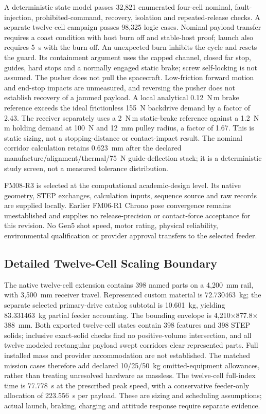 \documentclass[conference]{IEEEtran}
\begin{document}
A deterministic state model passes 32,821 enumerated four-cell nominal, fault-injection, prohibited-command, recovery, isolation and repeated-release checks. A separate twelve-cell campaign passes 98,325 logic cases. Nominal payload transfer requires a coast condition with host burn off and stable-host proof; launch also requires 5~s with the burn off. An unexpected burn inhibits the cycle and resets the guard. Its containment argument uses the capped channel, closed far stop, guides, hard stops and a normally engaged static brake; screw self-locking is not assumed. The pusher does not pull the spacecraft. Low-friction forward motion and end-stop impacts are unmeasured, and reversing the pusher does not establish recovery of a jammed payload. A local analytical 0.12~N\,m brake reference exceeds the ideal frictionless 155~N backdrive demand by a factor of 2.43. The receiver separately uses a 2~N\,m static-brake reference against a 1.2~N\,m holding demand at 100~N and 12~mm pulley radius, a factor of 1.67. This is static sizing, not a stopping-distance or contact-impact result. The nominal corridor calculation retains 0.623~mm after the declared manufacture/alignment/thermal/75~N guide-deflection stack; it is a deterministic study screen, not a measured tolerance distribution.

FM08-R3 is selected at the computational academic-design level. Its native geometry, STEP exchanges, calculation inputs, sequence source and raw records are supplied locally. Earlier FM06-R1 Chrono pose convergence remains unestablished and supplies no release-precision or contact-force acceptance for this revision. No Gen5 shot speed, motor rating, physical reliability, environmental qualification or provider approval transfers to the selected feeder.

\subsection{Detailed Twelve-Cell Scaling Boundary}
The native twelve-cell extension contains 398 named parts on a 4,200~mm rail, with 3,500~mm receiver travel. Represented custom material is 72.730463~kg; the separate selected primary-drive catalog subtotal is 10.601~kg, yielding 83.331463~kg partial feeder accounting. The bounding envelope is 4,210$\times$877.8$\times$388~mm. Both exported twelve-cell states contain 398 features and 398 STEP solids; inclusive exact-solid checks find no positive-volume intersection, and all twelve modeled rectangular payload swept corridors clear represented parts. Full installed mass and provider accommodation are not established. The matched mission cases therefore add declared 10/25/50~kg omitted-equipment allowances, rather than treating unresolved hardware as massless. The twelve-cell full-index time is 77.778~s at the prescribed peak speed, with a conservative feeder-only allocation of 223.556~s per payload. These are sizing and scheduling assumptions; actual launch, braking, charging and attitude response require separate evidence.
\end{document}
